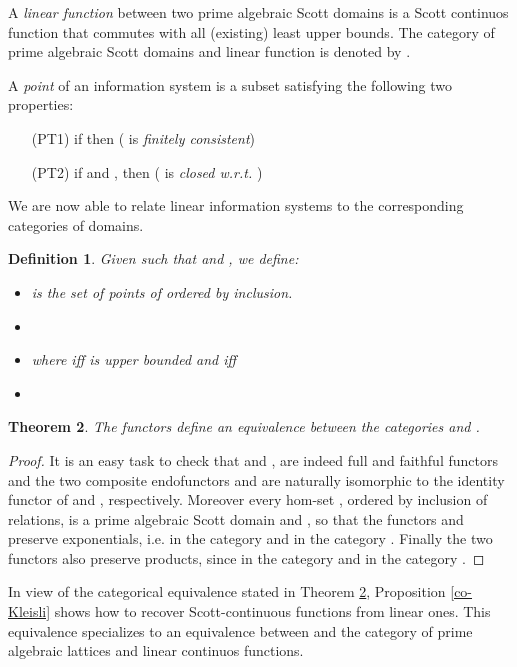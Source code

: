 \documentclass[copyright,creativecommons]{eptcs}
\newtheorem{theorem}{Theorem}
\newtheorem{definition}[theorem]{Definition}
\begin{document}
A \emph{linear function} between two prime algebraic Scott domains is a Scott continuos function that commutes with all (existing) least upper bounds. The category of prime algebraic Scott domains and linear function is denoted by .

\newpage

A \emph{point} of an information system  is a subset  satisfying the following two properties:
\begin{itemize}
\item[(PT1)] if  then  ( is \emph{finitely consistent})
\item[(PT2)] if  and , then  ( is \emph{closed w.r.t.} )
\end{itemize}

We are now able to relate linear information systems to the corresponding categories of domains.

\begin{definition}\label{functors-for-equivalence}
Given  such that  and , we define:
\begin{itemize}
\item  is the set of points of  ordered by inclusion.

\item 

\item  where 
 iff  is upper bounded and  iff 

\item 
\end{itemize}
\end{definition}

\begin{theorem}\label{equivalence}
The functors  define an equivalence between the categories  and .
\end{theorem}

\begin{proof}
It is an easy task to check that  and , are indeed full and faithful functors and the two composite endofunctors  and  are naturally isomorphic to the identity functor of  and , respectively. Moreover every hom-set , ordered by inclusion of relations, is a prime algebraic Scott domain and , so that the functors  and  preserve exponentials, i.e.  in the category  and  in the category . Finally the two functors also preserve products, since  in the category  and  in the category .
\end{proof}

In view of the categorical equivalence stated in Theorem \ref{equivalence}, Proposition \ref{co-Kleisli} shows how to recover Scott-continuous functions from linear ones. This equivalence specializes to an equivalence between  and the category  of prime algebraic lattices and linear continuos functions.
\end{document}
